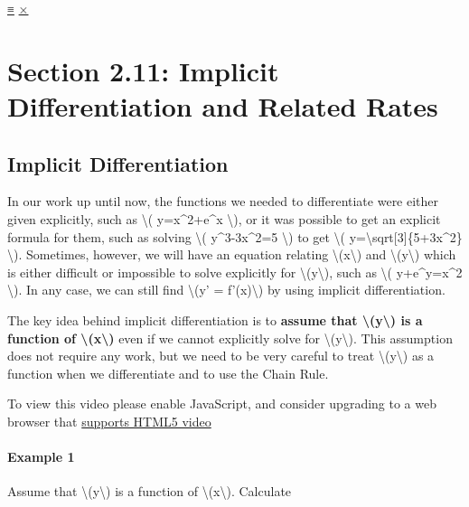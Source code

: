 \protect\hyperlink{main-nav}{≡} \protect\hyperlink{close-nav}{×}

\hypertarget{section-2.11-implicit-differentiation-and-related-rates}{%
\section{Section 2.11: Implicit Differentiation and Related
Rates}\label{section-2.11-implicit-differentiation-and-related-rates}}

\hypertarget{implicit-differentiation}{%
\subsection{Implicit Differentiation}\label{implicit-differentiation}}

In our work up until now, the functions we needed to differentiate were
either given explicitly, such as \textbackslash{}( y=x\^{}2+e\^{}x
\textbackslash{}), or it was possible to get an explicit formula for
them, such as solving \textbackslash{}( y\^{}3-3x\^{}2=5
\textbackslash{}) to get \textbackslash{}(
y=\textbackslash{}sqrt{[}3{]}\{5+3x\^{}2\} \textbackslash{}). Sometimes,
however, we will have an equation relating
\textbackslash{}(x\textbackslash{}) and
\textbackslash{}(y\textbackslash{}) which is either difficult or
impossible to solve explicitly for \textbackslash{}(y\textbackslash{}),
such as \textbackslash{}( y+e\^{}y=x\^{}2 \textbackslash{}). In any
case, we can still find \textbackslash{}(y' = f'(x)\textbackslash{}) by
using implicit differentiation.

The key idea behind implicit differentiation is to \textbf{assume that
\textbackslash{}(y\textbackslash{}) is a function of
\textbackslash{}(x\textbackslash{})} even if we cannot explicitly solve
for \textbackslash{}(y\textbackslash{}). This assumption does not
require any work, but we need to be very careful to treat
\textbackslash{}(y\textbackslash{}) as a function when we differentiate
and to use the Chain Rule.

To view this video please enable JavaScript, and consider upgrading to a
web browser that \href{http://videojs.com/html5-video-support/}{supports
HTML5 video}

\hypertarget{example-1}{%
\paragraph{Example 1}\label{example-1}}

Assume that \textbackslash{}(y\textbackslash{}) is a function of
\textbackslash{}(x\textbackslash{}). Calculate

